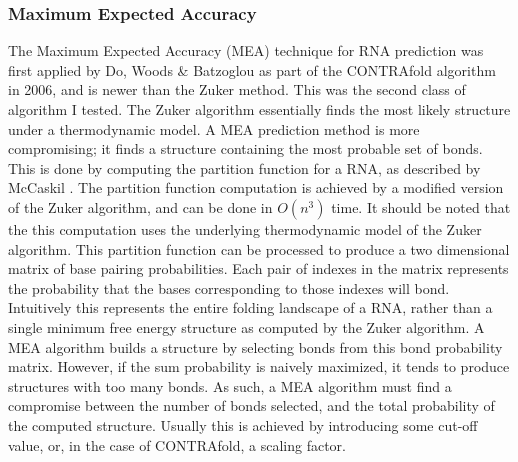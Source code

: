 \documentclass[12pt, a4paper]{article}
\begin{document}
\subsubsection{Maximum Expected Accuracy}
The Maximum Expected Accuracy (MEA) technique for RNA prediction was first applied by Do, Woods \& Batzoglou as part of the CONTRAfold algorithm \cite{do2006contrafold} in 2006, and is newer than the Zuker method. This was the second class of algorithm I tested. The Zuker algorithm essentially finds the most likely structure under a thermodynamic model. A MEA prediction method is more compromising; it finds a structure containing the most probable set of bonds. This is done by computing the partition function for a RNA, as described by McCaskil \cite{mccaskill1990equilibrium}. The partition function computation is achieved by a modified version of the Zuker algorithm, and can be done in $O(n^3)$ time. It should be noted that the this computation uses the underlying thermodynamic model of the Zuker algorithm. This partition function can be processed to produce a two dimensional matrix of base pairing probabilities. Each pair of indexes in the matrix represents the probability that the bases corresponding to those indexes will bond. Intuitively this represents the entire folding landscape of a RNA, rather than a single minimum free energy structure as computed by the Zuker algorithm. A MEA algorithm builds a structure by selecting bonds from this bond probability matrix. However, if the sum probability is naively maximized, it tends to produce structures with too many bonds. As such, a MEA algorithm must find a compromise between the number of bonds selected, and the total probability of the computed structure. Usually this is achieved by introducing some cut-off value, or, in the case of CONTRAfold, a scaling factor.
\end{document}
